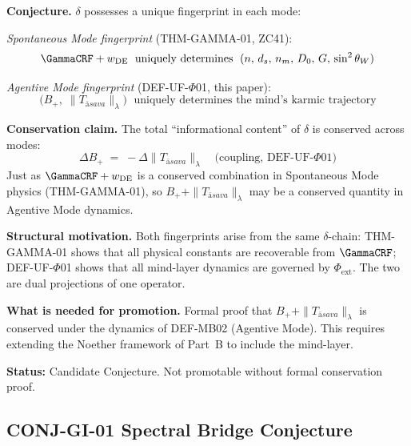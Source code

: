 \documentclass[12pt, a4paper]{article}
\providecommand{\Phiext}{\Phi_{\mathrm{ext}}}
\providecommand{\Bplus}{B_{+}}
\providecommand{\Tasava}{T_{\bar{\mathrm{a}}sava}}
\providecommand{\Tasava}{\mathcal{T}_{\!\mathrm{\bar{a}sava}}}
\begin{document}

\begin{formalbox}[title={CONJ-GH-01: Dual Fingerprint
  (Candidate)}]
\textbf{Conjecture.}
$\delta$ possesses a unique fingerprint in each mode:

\medskip
\textit{Spontaneous Mode fingerprint} (THM-GAMMA-01, ZC41):
\[
  \GammaCRF + w_{\rm DE}
  \;\text{ uniquely determines }\;
  (n,\, d_s,\, n_m,\, D_0,\, G,\, \sin^2\theta_W)
\]

\textit{Agentive Mode fingerprint} (DEF-UF-$\Phi$01,
this paper):
\[
  \bigl(\Bplus,\;\|\Tasava\|_\lambda\bigr)
  \;\text{ uniquely determines the mind's karmic trajectory}
\]

\textbf{Conservation claim.}
The total ``informational content'' of $\delta$ is conserved
across modes:
\[
  \Delta\Bplus \;=\; -\Delta\|\Tasava\|_\lambda
  \quad \text{(coupling, DEF-UF-$\Phi$01)}
\]
Just as $\GammaCRF + w_{\rm DE}$ is a conserved combination
in Spontaneous Mode physics (THM-GAMMA-01), so
$\Bplus + \|\Tasava\|_\lambda$ may be a conserved quantity
in Agentive Mode dynamics.

\textbf{Structural motivation.}
Both fingerprints arise from the same $\delta$-chain:
THM-GAMMA-01 shows that all physical constants are
recoverable from $\GammaCRF$; DEF-UF-$\Phi$01 shows
that all mind-layer dynamics are governed by $\Phiext$.
The two are dual projections of one operator.

\textbf{What is needed for promotion.}
Formal proof that $\Bplus + \|\Tasava\|_\lambda$ is
conserved under the dynamics of DEF-MB02 (Agentive Mode).
This requires extending the Noether framework of Part~B
to include the mind-layer.

\textbf{Status:} Candidate Conjecture.
Not promotable without formal conservation proof.
\end{formalbox}

\subsection{CONJ-GI-01 \quad Spectral Bridge Conjecture}

\end{document}
